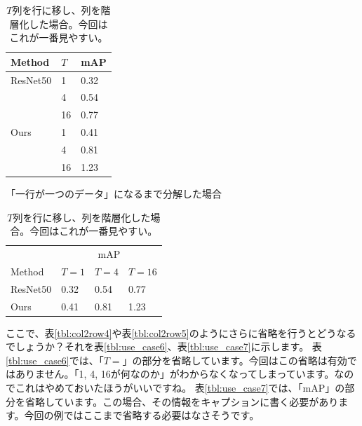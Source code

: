 \documentclass[uplatex,onecolumn,9pt,dvipdfmx]{jsarticle}
\newcommand{\Tref}[1]{表\ref{#1}}
\begin{document}
\begin{table}[h]
    \begin{minipage}{0.48\linewidth}
        \centering
        \begin{tabular}{@{}lll@{}} \toprule
            Method & $T$ & mAP \\ \midrule
            ResNet50 & 1  & 0.32 \\
                    & 4  & 0.54 \\
                    & 16 & 0.77 \\
            Ours     & 1  & 0.41 \\
                    & 4  & 0.81 \\
                    & 16 & 1.23 \\ \bottomrule   
        \end{tabular}
        \caption{「一行が一つのデータ」になるまで分解した場合}
        \label{tbl:use_case4}
    \end{minipage}
    \hfill
    \begin{minipage}{0.48\linewidth}
        \centering
        \begin{tabular}{@{}llll@{}} \toprule
            & \multicolumn{3}{c}{mAP} \\ \cmidrule(l){2-4}
            Method & $T=1$ & $T=4$ & $T=16$ \\ \midrule
            ResNet50  & 0.32 & 0.54 & 0.77 \\ 
            Ours      & 0.41 & 0.81 & 1.23 \\ \bottomrule   
        \end{tabular}
        \caption{$T$列を行に移し、列を階層化した場合。今回はこれが一番見やすい。}
        \label{tbl:use_case5}
    \end{minipage}
\end{table}

ここで、\Tref{tbl:col2row4}や\Tref{tbl:col2row5}のようにさらに省略を行うとどうなるでしょうか？それを\Tref{tbl:use_case6}、\Tref{tbl:use_case7}に示します。
\Tref{tbl:use_case6}では、「$T=$」の部分を省略しています。今回はこの省略は有効ではありません。「1, 4, 16が何なのか」がわからなくなってしまっています。なのでこれはやめておいたほうがいいですね。
\Tref{tbl:use_case7}では、「mAP」の部分を省略しています。この場合、その情報をキャプションに書く必要があります。今回の例ではここまで省略する必要はなさそうです。
\end{document}

